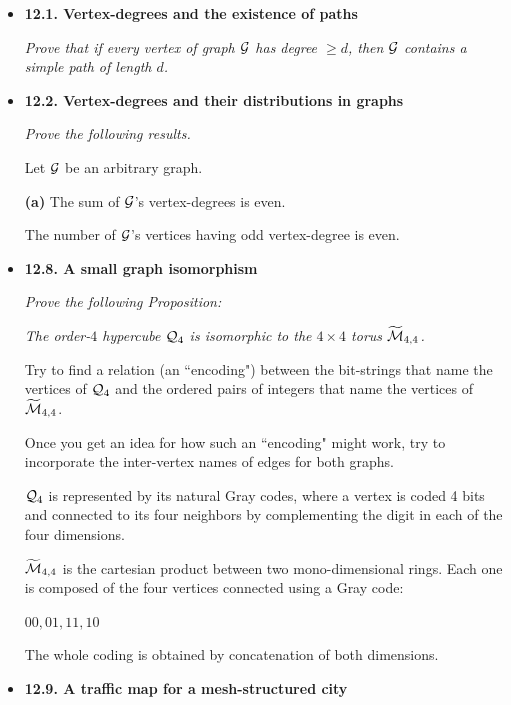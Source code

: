 \begin{itemize}
\item
{\bf 12.1. Vertex-degrees and the existence of paths}
\smallskip

{\em Prove that if every vertex of graph $\mbox{$\cal G$}$ has degree $\geq d$, then $\mbox{$\cal G$}$ contains a {\em simple} path of length $d$.}

\medskip\item
{\bf 12.2. Vertex-degrees and their distributions in graphs}
\smallskip

{\em Prove the following results.}

\begin{prop}
Let $\mbox{$\cal G$}$ be an arbitrary graph.
\smallskip

\noindent
{\bf (a)} The sum of $\mbox{$\cal G$}$'s vertex-degrees is even.
\smallskip

The number of $\mbox{$\cal G$}$'s vertices having odd vertex-degree is even.
\end{prop}

\medskip\item
{\bf 12.8. A small graph isomorphism}
\smallskip

{\em Prove the following Proposition:}
\smallskip

{\em The order-$4$ hypercube $\mbox{$\cal Q$}_4$ is \textit{isomorphic} to the $4 \times 4$ torus $\widetilde{\mbox{$\cal M$}}_{4,4}$.}
\smallskip

Try to find a relation (an ``encoding") between the bit-strings that name the vertices of $\mbox{$\cal Q$}_4$ and the ordered pairs of integers that name the vertices of $\widetilde{\mbox{$\cal M$}}_{4,4}$.

\smallskip 

Once you get an idea for how such an ``encoding" might work, try to incorporate the inter-vertex names of edges for both graphs.
\medskip

$\mbox{$\cal Q$}_4$ is represented by its natural Gray codes,
where a vertex is coded 4 bits and connected to its four neighbors by complementing 
the digit in each of the four dimensions.
\medskip

$\widetilde{\mbox{$\cal M$}}_{4,4}$ is the cartesian product between two mono-dimensional rings.
Each one is composed of the four vertices connected using a Gray code:

$00, 01, 11, 10$

The whole coding is obtained by concatenation of both dimensions.


\medskip\item
{\bf 12.9. A traffic map for a mesh-structured city}
\smallskip


\end{itemize}
